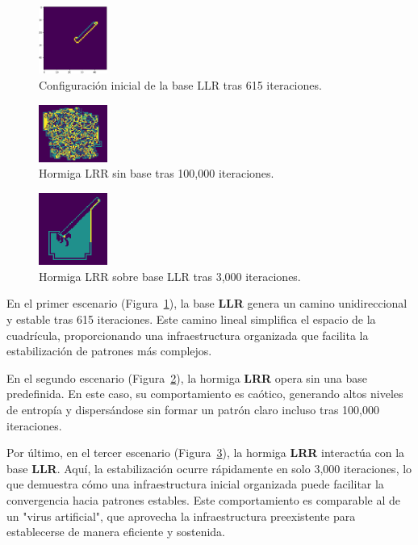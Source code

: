 \documentclass[11pt,letterpaper]{article}
\begin{document}
\begin{multicols}{2}
    \begin{figure}[h!]
        \includegraphics[width=0.2\textwidth]{reportTemplate/figures/llr.png}
        \caption{Configuración inicial de la base LLR tras 615 iteraciones.}
        \label{fig:llr_615}
    \end{figure}
    \hfill
    \begin{figure}[h!]
        \includegraphics[width=0.2\textwidth]{reportTemplate/figures/lrr_sin_base.png}
        \caption{Hormiga LRR sin base tras 100,000 iteraciones.}
        \label{fig:lrr_no_base}
    \end{figure}
    \hfill
    \begin{figure}[h!]
        \includegraphics[width=0.2\textwidth]{reportTemplate/figures/lrr_con_base.png}
        \caption{Hormiga LRR sobre base LLR tras 3,000 iteraciones.}
        \label{fig:lrr_base_llr}
    \end{figure}


En el primer escenario (Figura~\ref{fig:llr_615}), la base \textbf{LLR} genera un camino unidireccional y estable tras 615 iteraciones. Este camino lineal simplifica el espacio de la cuadrícula, proporcionando una infraestructura organizada que facilita la estabilización de patrones más complejos.

En el segundo escenario (Figura~\ref{fig:lrr_no_base}), la hormiga \textbf{LRR} opera sin una base predefinida. En este caso, su comportamiento es caótico, generando altos niveles de entropía y dispersándose sin formar un patrón claro incluso tras 100,000 iteraciones.

Por último, en el tercer escenario (Figura~\ref{fig:lrr_base_llr}), la hormiga \textbf{LRR} interactúa con la base \textbf{LLR}. Aquí, la estabilización ocurre rápidamente en solo 3,000 iteraciones, lo que demuestra cómo una infraestructura inicial organizada puede facilitar la convergencia hacia patrones estables. Este comportamiento es comparable al de un "virus artificial", que aprovecha la infraestructura preexistente para establecerse de manera eficiente y sostenida.

\end{multicols}
\end{document}
